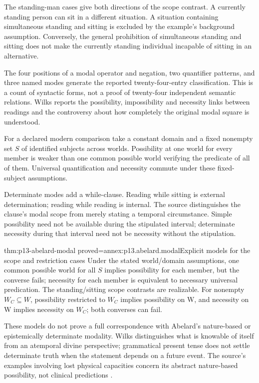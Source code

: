 The standing-man cases give both directions of the scope contrast.
A currently standing person can sit in a different situation.
A situation containing simultaneous standing and sitting is
excluded by the example's background assumption.
Conversely, the general prohibition of simultaneous standing and
sitting does not make the currently standing individual incapable
of sitting in an alternative.

The four positions of a modal operator and negation, two
quantifier patterns, and three named modes generate the reported
twenty-four-entry classification. This is a count of syntactic
forms, not a proof of twenty-four independent semantic relations.
Wilks reports the possibility, impossibility and necessity links
between readings and the controversy about how completely the
original modal square is understood.

For a declared modern comparison take a constant domain and a
fixed nonempty set \(S\) of identified subjects across worlds.
Possibility at one world for every member is weaker than
one common possible world verifying the predicate of all of them.
Universal quantification and necessity commute under these
fixed-subject assumptions.

Determinate modes add a while-clause. Reading while sitting
is external determination; reading while reading is internal.
The source distinguishes the clause's modal scope from merely
stating a temporal circumstance.
Simple possibility need not be available during the stipulated
interval; determinate necessity during that interval need not
be necessity without the stipulation.

\begin{hblemma}{thm:p13-abelard-modal}
 {proved=annex:p13.abelard.modal}{Explicit models for the scope and restriction cases}
Under the stated world/domain assumptions, one common possible
world for all \(S\) implies possibility for each member, but
the converse fails; necessity for each member is equivalent
to necessary universal predication.
The standing/sitting scope contrasts are realizable.
For nonempty \(W_C\subseteq W\), possibility restricted to
\(W_C\) implies possibility on W, and necessity on W implies
necessity on \(W_C\); both converses can fail.
\end{hblemma}

These models do not prove a full correspondence with Abelard's
nature-based or epistemically determinate modality.
Wilks distinguishes what is knowable of itself from an atemporal
divine perspective; grammatical present tense does not settle
determinate truth when the statement depends on a future event.
The source's examples involving lost physical capacities concern
its abstract nature-based possibility, not clinical predictions
\cite[pp.~110--116]{Wilks2007FordhamAbelard}.

